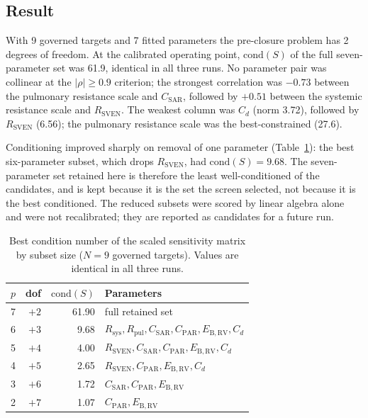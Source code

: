 \subsection{Result}

With 9 governed targets and 7 fitted parameters the pre-closure problem has
2 degrees of freedom. At the calibrated operating point, $\mathrm{cond}(S)$
of the full seven-parameter set was 61.9, identical in all three runs. No
parameter pair was collinear at the $|\rho| \ge 0.9$ criterion; the strongest
correlation was $-0.73$ between the pulmonary resistance scale and
$C_{\mathrm{SAR}}$, followed by $+0.51$ between the systemic resistance scale
and $R_{\mathrm{SVEN}}$. The weakest column was $C_d$ (norm 3.72), followed by
$R_{\mathrm{SVEN}}$ (6.56); the pulmonary resistance scale was the
best-constrained (27.6).

Conditioning improved sharply on removal of one parameter
(Table~\ref{tab:S-cond}): the best six-parameter subset, which drops
$R_{\mathrm{SVEN}}$, had $\mathrm{cond}(S) = 9.68$. The seven-parameter set
retained here is therefore the least well-conditioned of the candidates, and
is kept because it is the set the screen selected, not because it is the best
conditioned. The reduced subsets were scored by linear algebra alone and were
not recalibrated; they are reported as candidates for a future run.

\begin{table}[h]
\centering
\caption{Best condition number of the scaled sensitivity matrix by subset
size ($N = 9$ governed targets). Values are identical in all three runs.}
\label{tab:S-cond}
\begin{tabular}{rrrl}
\toprule
$p$ & dof & $\mathrm{cond}(S)$ & Parameters \\
\midrule
7 & $+2$ & 61.90 & full retained set \\
6 & $+3$ & 9.68 & $R_{\mathrm{sys}}, R_{\mathrm{pul}}, C_{\mathrm{SAR}}, C_{\mathrm{PAR}}, E_{\mathrm{B,RV}}, C_d$ \\
5 & $+4$ & 4.00 & $R_{\mathrm{SVEN}}, C_{\mathrm{SAR}}, C_{\mathrm{PAR}}, E_{\mathrm{B,RV}}, C_d$ \\
4 & $+5$ & 2.65 & $R_{\mathrm{SVEN}}, C_{\mathrm{PAR}}, E_{\mathrm{B,RV}}, C_d$ \\
3 & $+6$ & 1.72 & $C_{\mathrm{SAR}}, C_{\mathrm{PAR}}, E_{\mathrm{B,RV}}$ \\
2 & $+7$ & 1.07 & $C_{\mathrm{PAR}}, E_{\mathrm{B,RV}}$ \\
\bottomrule
\end{tabular}
\end{table}
